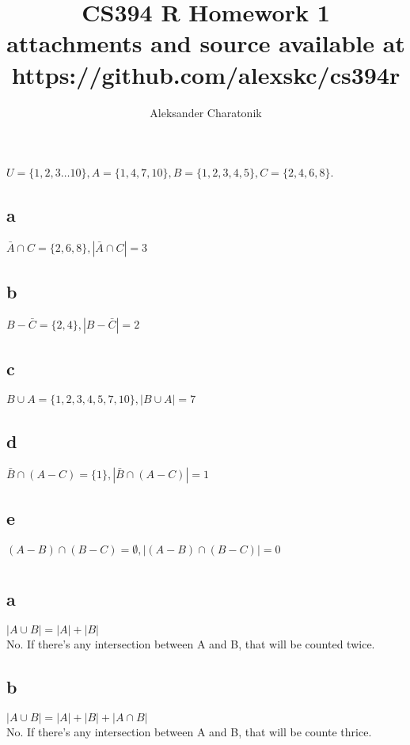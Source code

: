 \documentclass[12pt]{article}
\title{CS394 R Homework 1\\
\large attachments and source available at https://github.com/alexskc/cs394r}
\author{Aleksander Charatonik}
\begin{document}
\maketitle

\section{}
\(U=\{1,2,3\dots 10\}, A=\{1,4,7,10\}, B=\{1,2,3,4,5\}, C=\{2,4,6,8\}\).\\
\subsection*{a}
\(\bar{A} \cap C = \{2,6,8\}, |\bar{A} \cap C| = 3\)
\subsection*{b}
\(B-\bar{C} = \{2,4\}, |B-\bar{C}| = 2\)
\subsection*{c}
\(B \cup A = \{1,2,3,4,5,7,10\}, |B \cup A| = 7\)
\subsection*{d}
\(\bar{B} \cap (A - C) = \{1\}, |\bar{B} \cap (A - C)| = 1\)
\subsection*{e}
\((A - B) \cap (B - C) = \emptyset, |(A - B) \cap (B - C)| = 0\)

\section{}
\subsection*{a}
\(|A \cup B| = |A| + |B| \)\\
No. If there's any intersection between A and B, that will be counted twice.\\
\subsection*{b}
\(|A \cup B| = |A| + |B| + |A \cap B|\)\\
No. If there's any intersection between A and B, that will be counte thrice.\\
\end{document}
